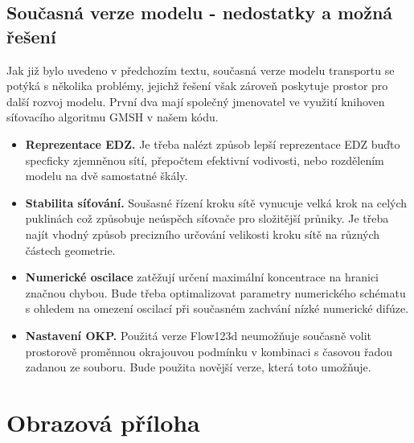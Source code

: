 \documentclass[11pt,a4paper]{article}
\begin{document}
\begin{onehalfspacing}
\subsection{Současná verze modelu - nedostatky a možná řešení}
\label{detskenemoci}
Jak již bylo uvedeno v předchozím textu, současná verze modelu transportu se potýká s několika problémy, jejichž řešení však zároveň poskytuje prostor pro další rozvoj modelu. První dva mají společný jmenovatel ve využití knihoven síťovacího algoritmu GMSH \cite{gmsh} v našem kódu.
\begin{itemize}
 \item {\bf Reprezentace EDZ.} Je třeba nalézt způsob lepší reprezentace EDZ buďto specficky zjemněnou sítí, přepočtem efektivní vodivosti, nebo rozdělením modelu na dvě samostatné škály.
 \item {\bf Stabilita síťování.} Soušasné řízení kroku sítě vynucuje velká krok na celých puklinách což způsobuje neúspěch síťovače
 pro složitější průniky. Je třeba najít vhodný způsob precizního určování velikosti kroku sítě na různých částech geometrie.
 \item {\bf Numerické oscilace} zatěžují určení maximální koncentrace na hranici značnou chybou. Bude třeba optimalizovat parametry numerického schématu s ohledem na omezení oscilací při současném zachvání nízké numerické difúze.
 \item {\bf Nastavení OKP.} Použitá verze Flow123d neumožňuje současně volit prostorově proměnnou okrajouvou podmínku v kombinaci s časovou řadou zadanou ze souboru. Bude použita novější verze, která toto umožňuje.
\end{itemize}





%


\section{Obrazová příloha}

\end{onehalfspacing}
\end{document}
